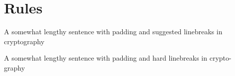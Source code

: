 \documentclass{amsart}
\begin{document}
\section{Rules}

A somewhat lengthy sentence with padding and suggested linebreaks in cryp\-to\-graphy


A somewhat lengthy sentence with padding and hard linebreaks in crypto-\\
graphy
\end{document}
